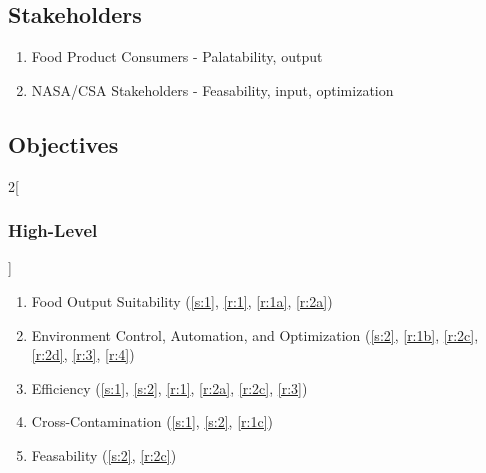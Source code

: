 \documentclass{report}
\begin{document}

\newpage

\subsection{Stakeholders}
\label{sec:stakeholders}

\begin{enumerate}[label=S\arabic*., ref=S\arabic*]
    \item \label{s:1} Food Product Consumers - Palatability, output
    \item \label{s:2} NASA/CSA Stakeholders - Feasability, input, optimization
\end{enumerate}

\subsection{Objectives}
\label{sec:objectives}

\begin{multicols}{2}[\subsubsection{High-Level}\label{sec:hlos}]
    \begin{enumerate}[label=HL\arabic*., ref=HL\arabic*]
        \item \label{hl:1} Food Output Suitability \hfill (\ref{s:1}, \ref{r:1}, \ref{r:1a}, \ref{r:2a})
        \item \label{hl:2} Environment Control, Automation, and Optimization \hfill (\ref{s:2}, \ref{r:1b}, \ref{r:2c}, \ref{r:2d}, \ref{r:3}, \ref{r:4})
        \item \label{hl:3} Efficiency \hfill (\ref{s:1}, \ref{s:2}, \ref{r:1}, \ref{r:2a}, \ref{r:2c}, \ref{r:3})
        \item \label{hl:4} Cross-Contamination \hfill (\ref{s:1}, \ref{s:2}, \ref{r:1c})
        \item \label{hl:7} Feasability \hfill (\ref{s:2}, \ref{r:2c})
    \end{enumerate}
\end{multicols}
\end{document}
